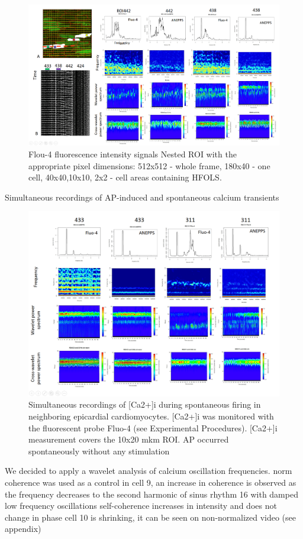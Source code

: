 \documentclass{biophys-new}
\begin{document}
\begin{figure}[hbt!]
\centering
\includegraphics[width=0.9\linewidth]{fig7.png}
\caption{Flou-4 fluorescence intensity signals Nested ROI with the appropriate pixel dimensions: 512x512 - whole frame, 180x40 - one cell, 40x40,10x10, 2x2 - cell areas containing HFOLS. }
\label{fig:fig7}
\end{figure}


Simultaneous recordings of AP-induced and spontaneous calcium transients

\begin{figure}[hbt!]
\centering
\includegraphics[width=0.9\linewidth]{fig8.png}
\caption{Simultaneous recordings of [Ca2+]i during spontaneous firing in neighboring epicardial cardiomyocytes. [Ca2+]i was monitored with the fluorescent probe Fluo-4 (see Experimental Procedures). [Ca2+]i measurement covers the 10x20 mkm ROI. AP occurred spontaneously without any stimulation}
\label{fig:fig8}
\end{figure}

We decided to apply a wavelet analysis of calcium oscillation frequencies. \cite{addison2018introduction}
norm coherence was used as a control
in cell 9, an increase in coherence is observed as the frequency decreases to the second harmonic of sinus rhythm
16 with damped low frequency oscillations
self-coherence increases in intensity and does not change in phase
cell 10 is shrinking, it can be seen on non-normalized video (see appendix)
\end{document}
